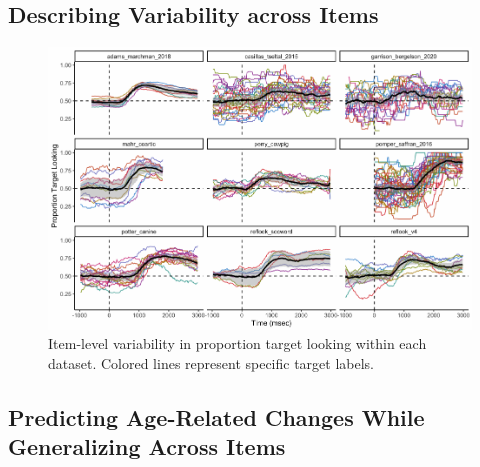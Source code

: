 \documentclass[10pt, letterpaper]{article}
\newenvironment{CodeChunk}{}{}
\begin{document}
\hypertarget{describing-variability-across-items}{%
\subsection{Describing Variability across
Items}\label{describing-variability-across-items}}

\begin{CodeChunk}
\begin{figure}[h]

{\centering \includegraphics{figs/peekbank_item_vis-1} 

}

\caption[Item-level variability in proportion target looking within each dataset]{Item-level variability in proportion target looking within each dataset. Colored lines represent specific target labels.}\label{fig:peekbank_item_vis}
\end{figure}
\end{CodeChunk}

\hypertarget{predicting-age-related-changes-while-generalizing-across-items}{%
\subsection{Predicting Age-Related Changes While Generalizing Across
Items}\label{predicting-age-related-changes-while-generalizing-across-items}}
\end{document}
